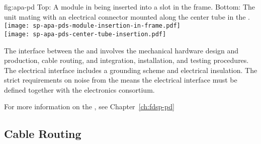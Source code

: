 \begin{dunefigure}{fig:apa-pd}
{Top: A  module in  being inserted into a slot in the frame. Bottom: The  unit mating with an electrical connector mounted along the center tube in the .
}
\texttt{[image: sp-apa-pds-module-insertion-in-frame.pdf]}\\
\vspace{2mm}
\texttt{[image: sp-apa-pds-center-tube-insertion.pdf]}
\end{dunefigure}

The interface between the  and  involves the mechanical hardware design and production, cable routing, and integration, installation, and testing procedures. %
The electrical interface includes a grounding scheme and electrical insulation. The strict requirements on noise from the  means the electrical interface must be defined together with the  electronics consortium. 

For more information on the , see Chapter~\ref{ch:fdsp-pd} %



\subsection{Cable Routing}
\label{sec:fdsp-apa-intfc-cables}

